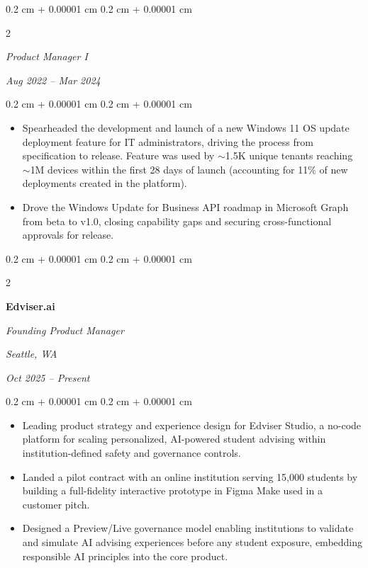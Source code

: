 \documentclass[10pt, letterpaper]{article}
\newenvironment{highlights}{
    \begin{itemize}[
        topsep=0.10 cm,
        parsep=0.10 cm,
        partopsep=0pt,
        itemsep=0pt,
        leftmargin=0.4 cm + 10pt
    ]
}{
    \end{itemize}
} %
\newenvironment{onecolentry}{
    \begin{adjustwidth}{
        0.2 cm + 0.00001 cm
    }{
        0.2 cm + 0.00001 cm
    }
}{
    \end{adjustwidth}
} %
\newenvironment{twocolentry}[2][]{
    \onecolentry
    \def\secondColumn{#2}
    \setcolumnwidth{\fill, 4.5 cm}
    \begin{paracol}{2}
}{
    \switchcolumn \raggedleft \secondColumn
    \end{paracol}
    \endonecolentry
} %
\begin{document}
        \vspace{0.2 cm}

        \begin{twocolentry}{
            
        \textit{Aug 2022 – Mar 2024}}
         
            
            \textit{Product Manager I}
        \end{twocolentry}

        \vspace{0.10 cm}
        \begin{onecolentry}
            \begin{highlights}
                \item Spearheaded the development and launch of a new Windows 11 OS update deployment feature for IT administrators, driving the process from specification to release. Feature was used by \(\sim \)1.5K unique tenants reaching \(\sim \)1M devices within the first 28 days of launch (accounting for 11\% of new deployments created in the platform). 
                \item Drove the Windows Update for Business API roadmap in Microsoft Graph from beta to v1.0, closing capability gaps and securing cross-functional approvals for release.    
            \end{highlights}
        \end{onecolentry}

        \vspace{0.2 cm}

        \begin{twocolentry}{
        \textit{Seattle, WA} 
        
        \textit{Oct 2025 – Present}}
        \textbf{Edviser.ai}
        
        \textit{Founding Product Manager}
        \end{twocolentry}

        \vspace{0.10 cm}
        \begin{onecolentry}
            \begin{highlights}
                \item Leading product strategy and experience design for Edviser Studio, a no-code platform for scaling personalized, AI-powered student advising within institution-defined safety and governance controls.
                \item Landed a pilot contract with an online institution serving 15,000 students by building a full-fidelity interactive prototype in Figma Make used in a customer pitch.
                \item Designed a Preview/Live governance model enabling institutions to validate and simulate AI advising experiences before any student exposure, embedding responsible AI principles into the core product.
            \end{highlights}
        \end{onecolentry}
\end{document}
